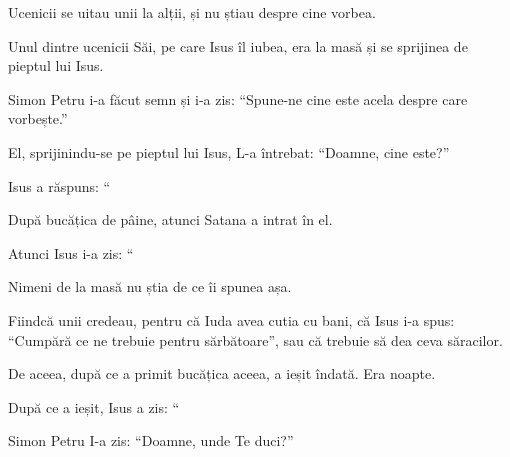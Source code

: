 {\par }{\PP {}Ucenicii se uitau unii la alții, și nu știau despre cine vorbea.

Unul dintre ucenicii Săi, pe care Isus îl iubea, era la masă și se sprijinea de pieptul lui Isus.

Simon Petru i-a făcut semn și i-a zis: “Spune-ne cine este acela despre care vorbește.”


\par }{\PP {}El, sprijinindu-se pe pieptul lui Isus, L-a întrebat: “Doamne, cine este?”


\par }{\PP {}Isus a răspuns: “{}

După bucățica de pâine, atunci Satana a intrat în el.

\par }{\PP Atunci Isus i-a zis: “{}


\par }{\PP {}Nimeni de la masă nu știa de ce îi spunea așa.

Fiindcă unii credeau, pentru că Iuda avea cutia cu bani, că Isus i-a spus: “Cumpără ce ne trebuie pentru sărbătoare”, sau că trebuie să dea ceva săracilor.

De aceea, după ce a primit bucățica aceea, a ieșit îndată. Era noapte.


\par }{\PP {}După ce a ieșit, Isus a zis: “{}






\par }{\PP {}Simon Petru I-a zis: “Doamne, unde Te duci?”

}
